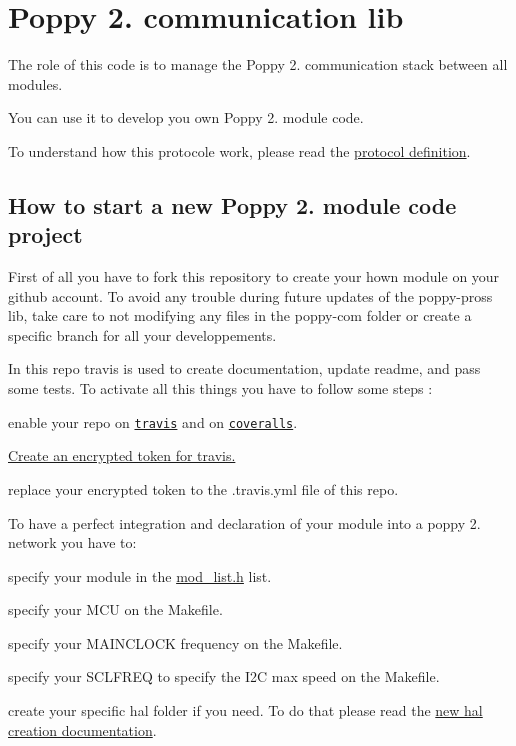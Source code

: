 \section*{Poppy 2. communication lib }

The role of this code is to manage the Poppy 2. communication stack between all modules.

You can use it to develop you own Poppy 2. module code.

To understand how this protocole work, please read the \hyperlink{md_doc_protocol_definition}{protocol definition}.

\subsection*{How to start a new Poppy 2. module code project }





First of all you have to fork this repository to create your hown module on your github account. To avoid any trouble during future updates of the poppy-\/pross lib, take care to not modifying any files in the poppy-\/com folder or create a specific branch for all your developpements. 



In this repo travis is used to create documentation, update readme, and pass some tests. To activate all this things you have to follow some steps \-:
\begin{DoxyItemize}
\item enable your repo on \href{https://travis-ci.org/}{\tt travis} and on \href{https://coveralls.io}{\tt coveralls}.
\item \hyperlink{md_doc_travis_encrypt}{Create an encrypted token for travis.}
\item replace your encrypted token to the .travis.\-yml file of this repo.
\end{DoxyItemize}





To have a perfect integration and declaration of your module into a poppy 2. network you have to\-:
\begin{DoxyItemize}
\item specify your module in the \hyperlink{mod__list_8h_source}{mod\-\_\-list.\-h} list.
\item specify your M\-C\-U on the Makefile.
\item specify your M\-A\-I\-N\-C\-L\-O\-C\-K frequency on the Makefile.
\item specify your S\-C\-L\-F\-R\-E\-Q to specify the I2\-C max speed on the Makefile.
\item create your specific hal folder if you need. To do that please read the \hyperlink{md_doc_hal_creation}{new hal creation documentation}. 
\end{DoxyItemize}